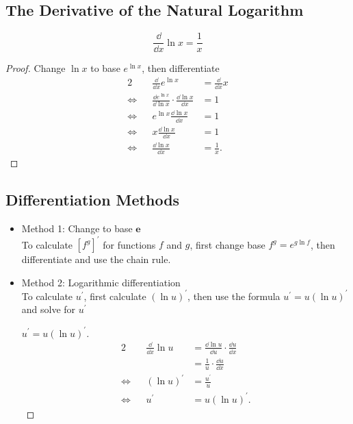 \subsection{The Derivative of the Natural Logarithm}
\[\frac\dd{\dd x}\ln x=\frac1 x\]
\begin{proof}
  Change $\ln x$ to base $e^{\ln x}$, then differentiate
  \begin{alignat*}{2}
             &&        \frac\dd{\dd x}e^{\ln x} & =\frac\dd{\dd x}x\\
    \iff{} && \frac{\dd e^{\ln x}}{\dd\ln x}\cdot\frac{\dd\ln x}{\dd x} & =1\\
    \iff{} && e^{\ln x}\frac{\dd\ln x}{\dd x} & =1\\
    \iff{} &&         x\frac{\dd\ln x}{\dd x} & =1\\
    \iff{} &&          \frac{\dd\ln x}{\dd x} & =\frac{1}{x}.
  \end{alignat*}
\end{proof}

\subsection{Differentiation Methods}
\begin{itemize}
\item Method 1: Change to base $\bm{e}$\\
To calculate $[f^g]^\prime$ for functions $f$ and $g$, first change base $f^g=e^{g\ln f}$, then differentiate and use the chain rule.
\item Method 2: Logarithmic differentiation\\
To calculate $u^\prime$, first calculate $(\ln u)^\prime$, then use the formula $u^\prime=u(\ln u)^\prime$ and solve for $u^\prime$
  \begin{proof}[$u^\prime=u(\ln u)^\prime$]
    \begin{alignat*}{2}
      && \frac{\dd }{\dd x}\ln u & =\frac{\dd \ln u}{\dd u}\cdot\frac{\dd u}{\dd x}\\
      &&                         & =\frac1 u\cdot\frac{\dd u}{\dd x}\\
      \iff && (\ln u)^\prime     & =\frac{u^\prime}{u}\\
      \iff && u^\prime           & =u(\ln u)^\prime .
    \end{alignat*}
  \end{proof}
\end{itemize}
